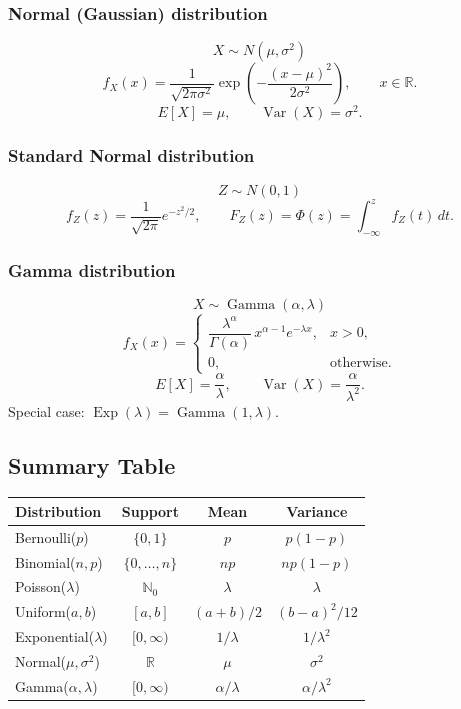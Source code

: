 \documentclass[12pt]{article}
\begin{document}
\subsubsection*{Normal (Gaussian) distribution}
\[
X \sim N(\mu, \sigma^2)
\]
\[
f_X(x) = \frac{1}{\sqrt{2\pi\sigma^2}}
\exp\!\left(-\frac{(x - \mu)^2}{2\sigma^2}\right), \qquad x \in \mathbb{R}.
\]
\[
E[X] = \mu, \qquad \operatorname{Var}(X) = \sigma^2.
\]

\subsubsection*{Standard Normal distribution}
\[
Z \sim N(0,1)
\]
\[
f_Z(z) = \frac{1}{\sqrt{2\pi}} e^{-z^2/2},
\qquad
F_Z(z) = \Phi(z) = \int_{-\infty}^{z} f_Z(t)\,dt.
\]

\subsubsection*{Gamma distribution}
\[
X \sim \operatorname{Gamma}(\alpha, \lambda)
\]
\[
f_X(x) =
\begin{cases}
\dfrac{\lambda^{\alpha}}{\Gamma(\alpha)}\, x^{\alpha-1} e^{-\lambda x}, & x > 0,\\
0, & \text{otherwise.}
\end{cases}
\]
\[
E[X] = \dfrac{\alpha}{\lambda}, \qquad \operatorname{Var}(X) = \dfrac{\alpha}{\lambda^2}.
\]
Special case: \(\operatorname{Exp}(\lambda) = \operatorname{Gamma}(1,\lambda).\)

\subsection{Summary Table}

\begin{center}
\begin{tabular}{lccc}
\hline
\textbf{Distribution} & \textbf{Support} & \textbf{Mean} & \textbf{Variance} \\ \hline
Bernoulli($p$) & $\{0,1\}$ & $p$ & $p(1-p)$ \\
Binomial($n,p$) & $\{0,\dots,n\}$ & $np$ & $np(1-p)$ \\
Poisson($\lambda$) & $\mathbb{N}_0$ & $\lambda$ & $\lambda$ \\
Uniform($a,b$) & $[a,b]$ & $(a+b)/2$ & $(b-a)^2/12$ \\
Exponential($\lambda$) & $[0,\infty)$ & $1/\lambda$ & $1/\lambda^2$ \\
Normal($\mu,\sigma^2$) & $\mathbb{R}$ & $\mu$ & $\sigma^2$ \\
Gamma($\alpha,\lambda$) & $[0,\infty)$ & $\alpha/\lambda$ & $\alpha/\lambda^2$ \\
\hline
\end{tabular}
\end{center}
\end{document}
